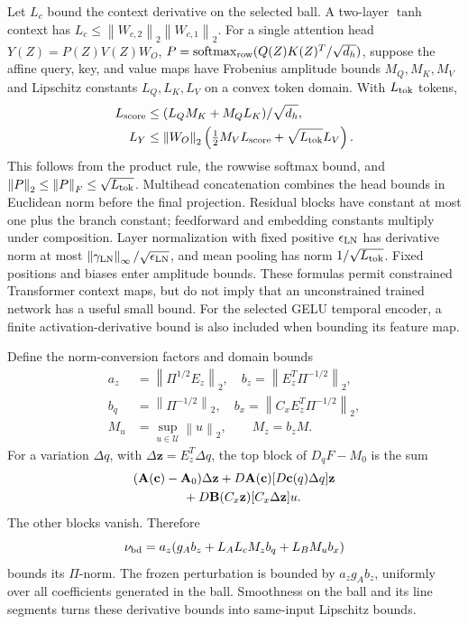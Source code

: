 \documentclass[journal]{IEEEtran}
\newcommand{\vz}{\mathbf{z}}
\newcommand{\vc}{\mathbf{c}}
\newcommand{\mA}{\mathbf{A}}
\newcommand{\mB}{\mathbf{B}}
\newcommand{\norm}[1]{\left\lVert #1\right\rVert}
\begin{document}
Let $L_c$ bound the context derivative on the selected ball. A two-layer $\tanh$ context has $L_c\le\norm{W_{c,2}}_2\norm{W_{c,1}}_2$. For a single attention head $Y(Z)=P(Z)V(Z)W_O$, $P=\operatorname{softmax}_{\rm row}(Q(Z)K(Z)^T/\sqrt{d_h})$, suppose the affine query, key, and value maps have Frobenius amplitude bounds $M_Q,M_K,M_V$ and Lipschitz constants $L_Q,L_K,L_V$ on a convex token domain. With $L_{\rm tok}$ tokens,
\begin{equation}
\begin{split}
L_{\rm score}&\le(L_QM_K+M_QL_K)/\sqrt{d_h},\\
L_Y&\le\norm{W_O}_2\left(\tfrac12M_VL_{\rm score}
+\sqrt{L_{\rm tok}}L_V\right).
\end{split}
\label{eq:attention_bound}
\end{equation}
This follows from the product rule, the rowwise softmax bound, and $\norm{P}_2\le\norm{P}_F\le\sqrt{L_{\rm tok}}$. Multihead concatenation combines the head bounds in Euclidean norm before the final projection. Residual blocks have constant at most one plus the branch constant; feedforward and embedding constants multiply under composition. Layer normalization with fixed positive $\epsilon_{\rm LN}$ has derivative norm at most $\norm{\gamma_{\rm LN}}_\infty/\sqrt{\epsilon_{\rm LN}}$, and mean pooling has norm $1/\sqrt{L_{\rm tok}}$. Fixed positions and biases enter amplitude bounds. These formulas permit constrained Transformer context maps, but do not imply that an unconstrained trained network has a useful small bound. For the selected GELU temporal encoder, a finite activation-derivative bound is also included when bounding its feature map.

Define the norm-conversion factors and domain bounds
\begin{equation}
\begin{split}
a_z&=\norm{\Pi^{1/2}E_z}_2,\quad
b_z=\norm{E_z^T\Pi^{-1/2}}_2,\\
b_q&=\norm{\Pi^{-1/2}}_2,\quad
b_x=\norm{C_xE_z^T\Pi^{-1/2}}_2,\\
M_u&=\sup_{u\in\mathcal U}\norm{u}_2,\qquad M_z=b_zM.
\end{split}
\label{eq:norm_conversion}
\end{equation}
For a variation $\Delta q$, with $\Delta\vz=E_z^T\Delta q$, the top block of $D_qF-M_0$ is the sum
\begin{equation}
\begin{split}
&(\mA(\vc)-\mA_0)\Delta\vz
+D\mA(\vc)[D\vc(q)\Delta q]\vz\\
&\hspace{14mm}+D\mB(C_x\vz)[C_x\Delta\vz]u.
\end{split}
\label{eq:full_derivative}
\end{equation}
The other blocks vanish. Therefore
\begin{equation}
\nu_{\rm bd}=a_z(g_A b_z+L_A L_cM_zb_q+L_BM_ub_x)
\label{eq:derivative_budget}
\end{equation}
bounds its $\Pi$-norm. The frozen perturbation is bounded by $a_zg_A b_z$, uniformly over all coefficients generated in the ball. Smoothness on the ball and its line segments turns these derivative bounds into same-input Lipschitz bounds.
\end{document}
